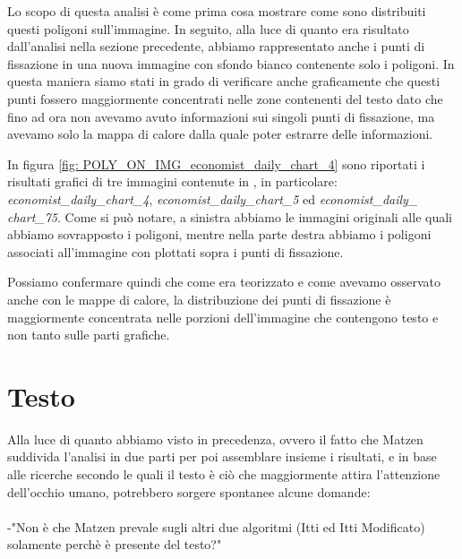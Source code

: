 \documentclass[%
	corpo=12pt,
    twoside,
    stile=classica,
    oldstyle,
    tipotesi=custom,
    greek,
    evenboxes,
]{toptesi}
\begin{document}
{Lo scopo di questa analisi è come prima cosa mostrare come sono distribuiti questi poligoni sull'immagine. In seguito, alla luce di quanto era risultato dall'analisi nella sezione precedente, abbiamo rappresentato anche i punti di fissazione in una nuova immagine con sfondo bianco contenente solo i poligoni. In questa maniera siamo stati in grado di verificare anche graficamente che questi punti fossero maggiormente concentrati nelle zone contenenti del testo dato che fino ad ora non avevamo avuto informazioni sui singoli punti di fissazione, ma avevamo solo la mappa di calore dalla quale poter estrarre delle informazioni.

In figura \ref{fig: POLY_ON_IMG_economist_daily_chart_4} sono riportati i risultati grafici di tre immagini contenute in , in particolare: \textit{economist\_daily\_chart\_4}, \textit{economist\_daily\_chart\_5} ed \textit{economist\_daily\_} \textit{chart\_75}. Come si può notare, a sinistra abbiamo le immagini originali alle quali abbiamo sovrapposto i poligoni, mentre nella parte destra abbiamo i poligoni associati all'immagine con plottati sopra i punti di fissazione.



Possiamo confermare quindi che come era teorizzato e come avevamo osservato anche con le mappe di calore, la distribuzione dei punti di fissazione è maggiormente concentrata nelle porzioni dell'immagine che contengono testo e non tanto sulle parti grafiche.




\section{Testo} 


Alla luce di quanto abbiamo visto in precedenza, ovvero il fatto che Matzen suddivida l'analisi in due parti per poi assemblare insieme i risultati, e in base alle ricerche secondo le quali il testo è ciò che maggiormente attira l'attenzione dell'occhio umano, potrebbero sorgere spontanee alcune domande: 
\\\\
-"Non è che Matzen prevale sugli altri due algoritmi (Itti ed Itti Modificato) solamente perchè è presente del testo?"

}
\end{document}
